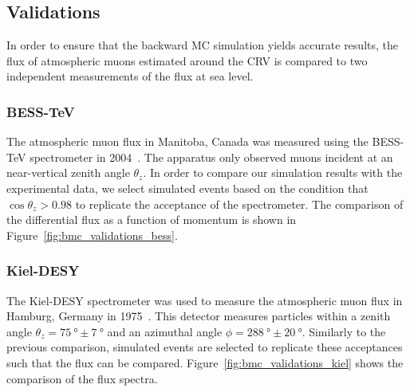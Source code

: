 
\subsection{Validations}
In order to ensure that the backward MC simulation yields accurate results, the
flux of atmospheric muons estimated around the CRV is compared to two
independent measurements of the flux at sea level.

\subsubsection{BESS-TeV}
The atmospheric muon flux in Manitoba, Canada was measured using the BESS-TeV
spectrometer in 2004~\cite{besstev}. The apparatus only observed muons incident
at an near-vertical zenith angle $\theta_z$. In order to compare our simulation
results with the experimental data, we select simulated events based on the
condition that $\cos \theta_z > 0.98$ to replicate the acceptance of the
spectrometer. The comparison of the differential flux as a function of momentum
is shown in Figure~\ref{fig:bmc_validations_bess}.

\subsubsection{Kiel-DESY}
The Kiel-DESY spectrometer was used to measure the atmospheric muon flux in
Hamburg, Germany in 1975~\cite{kieldesy}. This detector measures particles
within a zenith angle $\theta_z =\SI{75}{\degree} \pm \SI{7}{\degree}$ and an
azimuthal angle $\phi = \SI{288}{\degree} \pm \SI{20}{\degree}$. Similarly to
the previous comparison, simulated events are selected to replicate these
acceptances such that the flux can be compared.
Figure~\ref{fig:bmc_validations_kiel} shows the comparison of the flux spectra.

